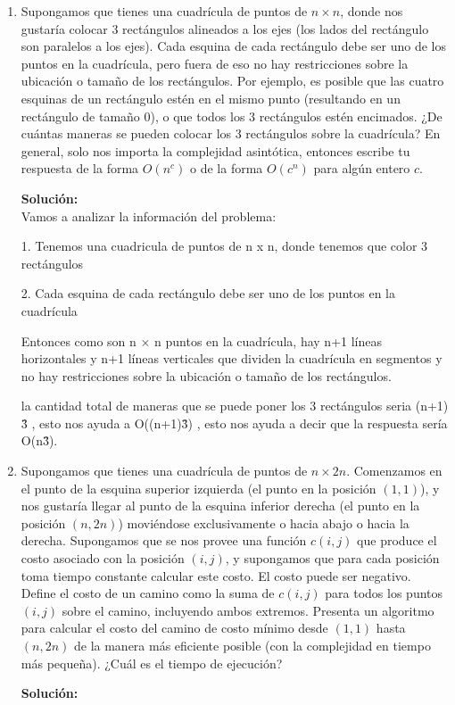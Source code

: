 \documentclass[11pt,letterpaper]{article}
\newenvironment{solution}{%
  \noindent\begin{shaded}
  \textbf{Solución:}\ }{
  \end{shaded}%
}
\begin{document}
\begin{enumerate}
\item%
  Supongamos que tienes una cuadrícula de puntos de \(n \times n\),
  donde nos gustaría colocar \(3\) rectángulos alineados a los ejes
  (los lados del rectángulo son paralelos a los ejes).  Cada esquina
  de cada rectángulo debe ser uno de los puntos en la cuadrícula, pero
  fuera de eso no hay restricciones sobre la ubicación o tamaño de los
  rectángulos.  Por ejemplo, es posible que las cuatro esquinas de un
  rectángulo estén en el mismo punto (resultando en un rectángulo de
  tamaño \(0\)), o que todos los \(3\) rectángulos estén encimados.
  ¿De cuántas maneras se pueden colocar los \(3\) rectángulos sobre la
  cuadrícula?  En general, solo nos importa la complejidad asintótica,
  entonces escribe tu respuesta de la forma \(O(n^c)\) o de la forma
  \(O(c^n)\) para algún entero \(c\).
  \begin{solution}
    \\Vamos a analizar la información del problema:

1. Tenemos una cuadricula de puntos de n x n, donde tenemos que color 3 rectángulos

2. Cada esquina de cada rectángulo debe ser uno de los puntos en la cuadrícula

Entonces como son n × n puntos en la cuadrícula, hay n+1 líneas horizontales y n+1 líneas verticales que dividen la cuadrícula en segmentos y no hay restricciones sobre la ubicación o tamaño de los rectángulos.

la cantidad total de maneras que se puede poner los 3 rectángulos seria (n+1) \^3 , esto nos ayuda a O((n+1)\^3) , esto nos ayuda a decir que la respuesta sería O(n\^3).

  \end{solution}
\item%
  Supongamos que tienes una cuadrícula de puntos de \(n \times 2n\).
  Comenzamos en el punto de la esquina superior izquierda (el punto en
  la posición \((1,1)\)), y nos gustaría llegar al punto de la esquina
  inferior derecha (el punto en la posición \((n, 2n)\)) moviéndose
  exclusivamente o hacia abajo o hacia la derecha.  Supongamos que se
  nos provee una función \(c(i,j)\) que produce el costo asociado con
  la posición \((i,j)\), y supongamos que para cada posición toma
  tiempo constante calcular este costo.  El costo puede ser negativo.
  Define el costo de un camino como la suma de \(c(i,j)\) para todos
  los puntos \((i,j)\) sobre el camino, incluyendo ambos extremos.
  Presenta un algoritmo para calcular el costo del camino de costo
  mínimo desde \((1,1)\) hasta \((n,2n)\) de la manera más eficiente
  posible (con la complejidad en tiempo más pequeña).  ¿Cuál es el
  tiempo de ejecución?
  \begin{solution}
  \end{solution}
\end{enumerate}
\end{document}
